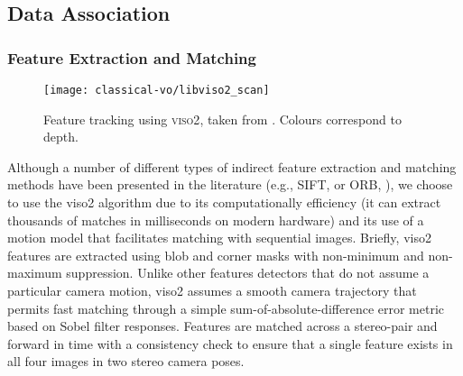\subsection{Data Association}
\label{sec:vo_data_extraction}
\subsubsection{Feature Extraction and Matching}
 
\begin{figure}[h!]
\begin{center}
		\texttt{[image: classical-vo/libviso2\_scan]}
		\caption{Feature tracking using \textsc{viso2}, taken from \cite{Geiger2011-xe}. Colours correspond to depth.}
  	\label{fig:vo_feature_tracking}
\end{center}
\end{figure}
Although a number of different types of indirect feature extraction and matching methods have been presented in the literature (e.g., \textsf{SIFT}, \cite{lowe_object_1999} or \textsf{ORB}, \cite{rublee2011orb}), we choose to use the \textsf{viso2} \citep{Geiger2011-xe} algorithm due to its computationally efficiency (it can extract thousands of matches in milliseconds on modern hardware) and its use of a motion model that facilitates matching with sequential images. Briefly, \textsf{viso2} features are extracted using blob and corner masks with non-minimum and non-maximum suppression. Unlike other features detectors that do not assume a particular camera motion, \textsf{viso2} assumes a smooth camera trajectory that permits fast matching through a simple sum-of-absolute-difference error metric based on Sobel filter responses. Features are matched across a stereo-pair and forward in time with a consistency check to ensure that a single feature exists in all four images in two stereo camera poses. 
